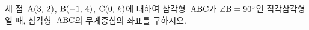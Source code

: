 세 점~$\mathrm{A}(3,\,2)$, $\mathrm{B}(-1,\,4)$, $\mathrm{C}(0,\,k)$에 대하여 삼각형~$\mathrm{ABC}$가 $\angle\mathrm{B}=90^\circ$인 직각삼각형일 때, 삼각형~$\mathrm{ABC}$의 무게중심의 좌표를 구하시오.
